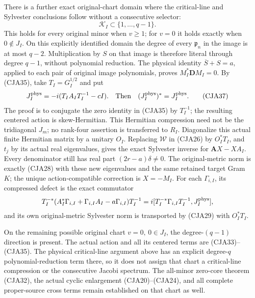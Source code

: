 \documentclass[11pt,a4paper]{article}
\begin{document}
There is a further exact original-chart domain where the
critical-line and Sylvester conclusions follow without a
consecutive selector:
\begin{equation}
 \mathcal K_I\subset\{1,\ldots,q-1\}.
 \tag{CJA36}
\end{equation}
This holds for every original minor when \(v\geq1\); for \(v=0\)
it holds exactly when \(0\notin J_I\).
On this explicitly identified domain the degree of every
\(\mathfrak p_n\) in the image is at most \(q-2\).
Multiplication by \(S\) on that image is therefore literal
through degree \(q-1\), without polynomial reduction.
The physical identity \(\overline S+S=a\), applied to each pair
of original image polynomials, proves
\(M_I^*\mathbf DM_I=0\).
By (CJA35), take \(T_I=G_I^{1/2}\) and put
\begin{equation}
 J_I^{\rm phys}=-i(T_IA_IT_I^{-1}-cI).
 \quad\text{Then}\quad
 (J_I^{\rm phys})^*=J_I^{\rm phys}.
 \tag{CJA37}
\end{equation}
The proof is to conjugate the zero identity in (CJA35) by
\(T_I^{-1}\); the resulting centered action is skew-Hermitian.
This Hermitian compression need not be the tridiagonal \(J_m\);
no rank-four assertion is transferred to \(R_I\).
Diagonalize this actual finite Hermitian matrix by a unitary
\(O_I\).  Replacing \(\mathcal W\) in (CJA26) by \(O_I^*T_I\),
and \(t_j\) by its actual real eigenvalues, gives the exact
Sylvester inverse for
\(\mathbf AX-XA_I\).
Every denominator still has real part \((2r-a)\delta\ne0\).
The original-metric norm is exactly (CJA28) with these new
eigenvalues and the same retained target Gram \(K\);
the unique action-compatible correction is \(X=-M_I\).
For each \(\Gamma_{i,I}\), its compressed defect is the exact
commutator
\[
 T_I^{-*}(A_I^*\Gamma_{i,I}+\Gamma_{i,I}A_I-a\Gamma_{i,I})T_I^{-1}
  =i[T_I^{-*}\Gamma_{i,I}T_I^{-1},J_I^{\rm phys}],
 \]
and its own original-metric Sylvester norm is transported by
(CJA29) with \(O_I^*T_I\).

On the remaining possible original chart \(v=0,\ 0\in J_I\),
the degree-\((q-1)\) direction is present.
The actual action and all its centered terms are (CJA33)--(CJA35).
The physical critical-line argument above has an explicit
degree-\(q\) polynomial-reduction term there, so it does not
assign that chart a critical-line compression or the
consecutive Jacobi spectrum.
The all-minor zero-core theorem (CJA32), the actual cyclic
enlargement (CJA20)--(CJA24), and all complete proper-source
cross terms remain established on that chart as well.
\end{document}
